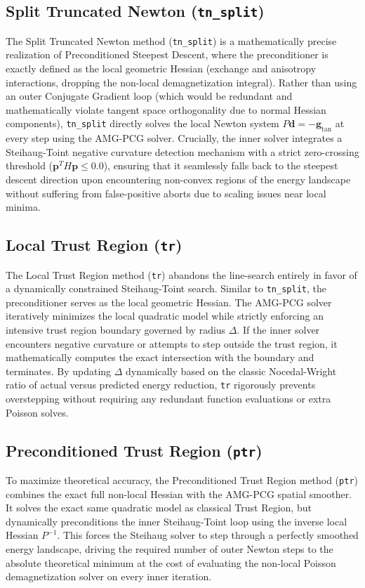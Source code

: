 \documentclass[11pt,a4paper]{article}
\begin{document}
\subsection{Split Truncated Newton (\texttt{tn\_split})}
The Split Truncated Newton method (\texttt{tn\_split}) is a mathematically precise realization of Preconditioned Steepest Descent, where the preconditioner is exactly defined as the local geometric Hessian (exchange and anisotropy interactions, dropping the non-local demagnetization integral). Rather than using an outer Conjugate Gradient loop (which would be redundant and mathematically violate tangent space orthogonality due to normal Hessian components), \texttt{tn\_split} directly solves the local Newton system $P \mathbf{d} = -\mathbf{g}_{\text{tan}}$ at every step using the AMG-PCG solver. Crucially, the inner solver integrates a Steihaug-Toint negative curvature detection mechanism with a strict zero-crossing threshold ($\mathbf{p}^T H \mathbf{p} \le 0.0$), ensuring that it seamlessly falls back to the steepest descent direction upon encountering non-convex regions of the energy landscape without suffering from false-positive aborts due to scaling issues near local minima.

\subsection{Local Trust Region (\texttt{tr})}
The Local Trust Region method (\texttt{tr}) abandons the line-search entirely in favor of a dynamically constrained Steihaug-Toint search. Similar to \texttt{tn\_split}, the preconditioner serves as the local geometric Hessian. The AMG-PCG solver iteratively minimizes the local quadratic model while strictly enforcing an intensive trust region boundary governed by radius $\Delta$. If the inner solver encounters negative curvature or attempts to step outside the trust region, it mathematically computes the exact intersection with the boundary and terminates. By updating $\Delta$ dynamically based on the classic Nocedal-Wright ratio of actual versus predicted energy reduction, \texttt{tr} rigorously prevents overstepping without requiring any redundant function evaluations or extra Poisson solves.

\subsection{Preconditioned Trust Region (\texttt{ptr})}
To maximize theoretical accuracy, the Preconditioned Trust Region method (\texttt{ptr}) combines the exact full non-local Hessian with the AMG-PCG spatial smoother. It solves the exact same quadratic model as classical Trust Region, but dynamically preconditions the inner Steihaug-Toint loop using the inverse local Hessian $P^{-1}$. This forces the Steihaug solver to step through a perfectly smoothed energy landscape, driving the required number of outer Newton steps to the absolute theoretical minimum at the cost of evaluating the non-local Poisson demagnetization solver on every inner iteration.
\end{document}
